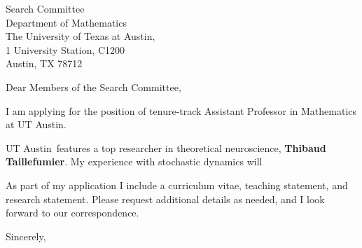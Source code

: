 \documentclass[11pt,a4paper]{letter}
\begin{document}

\def\School{UT Austin}

\begin{letter}
{Search Committee\\
Department of Mathematics\\
The University of Texas at Austin,\\
1 University Station, C1200\\
Austin, TX 78712
}


\opening{Dear Members of the Search Committee,}

I am applying for the position of tenure-track Assistant Professor in Mathematics at \School. 



\School~features a top researcher in theoretical neuroscience, \textbf{Thibaud Taillefumier}. My experience with stochastic dynamics will 



As part of my application I include a curriculum vitae, teaching statement, and research statement. Please request additional details as needed, and I look forward to our correspondence.

\closing{Sincerely,}
\end{letter}
\end{document}
